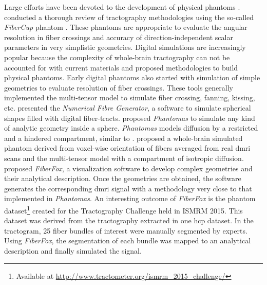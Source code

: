 \documentclass[english]{frontiers/frontiersSCNS} %
\begin{document}
Large efforts have been devoted to the development of physical phantoms
  \citep{lin_validation_2001,campbell_flowbased_2005,perrin_validation_2005,fieremans_simulation_2008,tournier_resolving_2008}.
\cite{cote_tractometer_2013} conducted a thorough review of tractography methodologies using the
  so-called \emph{FiberCup} phantom \citep{poupon_new_2008,fillard_quantitative_2011}.
These phantoms are appropriate to evaluate the angular resolution in fiber crossings and accuracy of
  direction-independent scalar parameters in very simplistic geometries.
Digital simulations are increasingly popular because the complexity of whole-brain tractography
  can not be accounted for with current materials and proposed methodologies to build physical phantoms.
Early digital phantoms also started with simulation of simple geometries
  \citep{basser_in_2000,goessl_fiber_2002,tournier_limitations_2002,leemans_mathematical_2005}
  to evaluate resolution of fiber crossings.
These tools generally implemented the multi-tensor model \citep{alexander_analysis_2001,tuch_high_2002}
  to simulate fiber crossing, fanning, kissing, etc.
\cite{close_software_2009} presented the \emph{Numerical Fibre Generator}, a software to simulate
  spherical shapes filled with digital fiber-tracts.
\cite{caruyer_phantomas_2014} proposed \emph{Phantomas} to simulate any kind of analytic geometry
  inside a sphere.
\emph{Phantomas} models diffusion by a restricted and a hindered compartment, similar to
  \citep{assaf_composite_2005}.
\cite{wilkins_fiber_2014} proposed a whole-brain simulated phantom derived from voxel-wise orientation
  of fibers averaged from real \gls*{dmri} scans and the multi-tensor model with a compartment of
  isotropic diffusion.
\cite{neher_fiberfox_2014} proposed \emph{FiberFox}, a visualization software to develop
  complex geometries and their analytical description.
Once the geometries are obtained, the software generates the corresponding \gls*{dmri} signal with a
  methodology very close to that implemented in \emph{Phantomas}.
An interesting outcome of \emph{FiberFox} is the phantom dataset\footnote{Available at
  \url{http://www.tractometer.org/ismrm_2015_challenge/}} created for the Tractography
  Challenge held in ISMRM 2015.
This dataset was derived from the tractography extracted in one \gls*{hcp} dataset.
In the tractogram, 25 fiber bundles of interest were manually segmented by experts.
Using \emph{FiberFox}, the segmentation of each bundle was mapped to an analytical
  description and finally simulated the signal.
\end{document}
